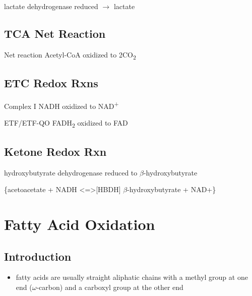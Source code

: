 \documentclass{scrartcl}
\begin{document}
\begin{description}
\item{lactate dehydrogenase} reduced \(\to\) lactate
\end{description}


\subsection{TCA Net Reaction}
\label{sec:org3036709}
\begin{description}
\item{Net reaction} Acetyl-CoA oxidized to 2CO\textsubscript{2}
\end{description}
{\tiny{}}

\subsection{ETC Redox Rxns}
\label{sec:org7ad7f16}
\begin{description}
\item{Complex I} NADH oxidized to NAD\textsuperscript{+}
\end{description}


\begin{description}
\item{ETF/ETF-QO} FADH\textsubscript{2} oxidized to FAD

\end{description}


\subsection{Ketone Redox Rxn}
\label{sec:orge7be012}
\begin{description}
\item{hydroxybutyrate dehydrogenase} reduced to \(\beta\)-hydroxybutyrate

\ce\{acetoacetate + NADH <=>[HBDH] \(\beta\)-hydroxybutyrate + NAD+\}
\end{description}

\section{Fatty Acid Oxidation}
\label{sec:org6a2e2b2}
\subsection{Introduction}
\label{sec:org0c00c98}
\begin{itemize}
\item fatty acids are usually straight aliphatic chains with a methyl
group at one end (\(\omega\)-carbon) and a carboxyl group at the other
end
\end{itemize}
\end{document}
